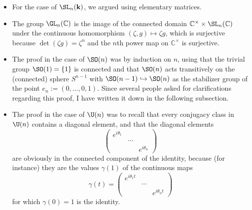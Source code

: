 \documentclass[reqno]{amsart} 
\begin{document}
\begin{itemize}
\item For the case of $\SL_n(\mathbf{k})$,
  we argued using elementary matrices.
\item The group $\GL_n(\mathbb{C})$ is the image of the
  connected domain  $\mathbb{C}^\times \times \SL_n(\mathbb{C})$
  under the continuous homomorphism
  $(\zeta,g) \mapsto \zeta g$, which is
  surjective because $\det(\zeta g) = \zeta^n$ and the $n$th power map on $\mathbb{C}^\times$
  is surjective.
\item The proof in the case of $\SO(n)$ was by induction on $n$,
  using that the trivial group $\SO(1) = \{1\}$ is connected and
  that $\SO(n)$ acts transitively on the (connected) sphere $S^{n-1}$ with
  $\SO(n-1) \hookrightarrow \SO(n)$ as the stabilizer group of
  the point $e_n := (0,\dotsc,0,1)$.  Since several people
  asked for clarifications regarding this proof, I have written it down in the following subsection.
\item The proof in the case of
  $\U(n)$ was to recall that every conjugacy class in $\U(n)$
  contains
  a diagonal element,
  and that the diagonal elements
  \begin{equation*}
  \begin{pmatrix}
    e^{i \theta_1} &  &  \\
     & \dotsb  &  \\
     &  & e^{i \theta_n}
  \end{pmatrix}
  \end{equation*}
  are obviously in the connected component of the identity,
  because (for instance)
  they are the values $\gamma(1)$
  of the continuous maps
  \begin{equation*}
  \gamma(t) = 
  \begin{pmatrix}
    e^{i \theta_1 t} &  &  \\
     & \dotsb  &  \\
     &  & e^{i \theta_n t}
  \end{pmatrix}
  \end{equation*}
  for which $\gamma(0) = 1$ is the identity.
\end{itemize}
\end{document}
